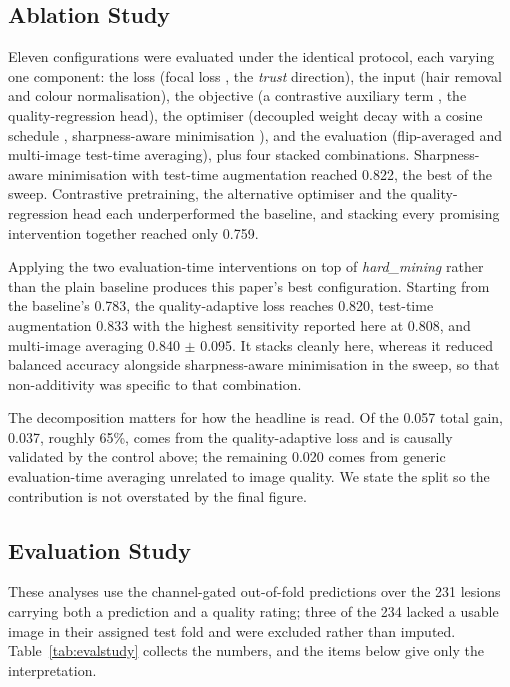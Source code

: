 \documentclass[conference]{IEEEtran}
\begin{document}
\subsection{Ablation Study}
Eleven configurations were evaluated under the identical protocol, each varying one component: the loss (focal loss \cite{focal}, the \emph{trust} direction), the input (hair removal and colour normalisation), the objective (a contrastive auxiliary term \cite{supcon}, the quality-regression head), the optimiser (decoupled weight decay with a cosine schedule \cite{adamw}, sharpness-aware minimisation \cite{sam}), and the evaluation (flip-averaged and multi-image test-time averaging), plus four stacked combinations. Sharpness-aware minimisation with test-time augmentation reached 0.822, the best of the sweep. Contrastive pretraining, the alternative optimiser and the quality-regression head each underperformed the baseline, and stacking every promising intervention together reached only 0.759.

Applying the two evaluation-time interventions on top of \emph{hard\_mining} rather than the plain baseline produces this paper's best configuration. Starting from the baseline's 0.783, the quality-adaptive loss reaches 0.820, test-time augmentation 0.833 with the highest sensitivity reported here at 0.808, and multi-image averaging 0.840 $\pm$ 0.095. It stacks cleanly here, whereas it reduced balanced accuracy alongside sharpness-aware minimisation in the sweep, so that non-additivity was specific to that combination.

The decomposition matters for how the headline is read. Of the 0.057 total gain, 0.037, roughly 65\%, comes from the quality-adaptive loss and is causally validated by the control above; the remaining 0.020 comes from generic evaluation-time averaging unrelated to image quality. We state the split so the contribution is not overstated by the final figure.

\subsection{Evaluation Study}
\label{sec:robustness}
These analyses use the channel-gated out-of-fold predictions over the 231 lesions carrying both a prediction and a quality rating; three of the 234 lacked a usable image in their assigned test fold and were excluded rather than imputed. Table~\ref{tab:evalstudy} collects the numbers, and the items below give only the interpretation.
\end{document}
